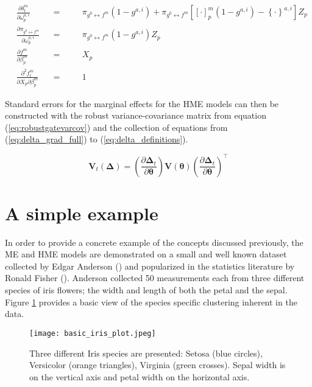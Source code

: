 \documentclass[12pt]{article}
\newcommand{\gateprod}[2]{\pi_{#1 \longleftrightarrow #2}}
\begin{document}
\begin{subequations} \label{eq:delta_definitions}
\begin{alignat}{3}
&\frac{\partial \delta^{m}_{t}}{\partial \omega^{a,i}_{p}}            &&=&\quad& \gateprod{g^{0}}{f^{m}} (1 - g^{a,i})  +  \gateprod{g^{0}}{f^{m}} \left[ \left[\cdot \right]^{m}_p  (1 - g^{a,i}) - \left\{ \cdot \right\}^{a,i}  \right] Z_{p} \label{eq:delta_gate_partial}\\
&\frac{\partial \gateprod{g^{0}}{f^{m}}}{\partial \omega^{a,i}_{p}}   &&=&\quad& \gateprod{g^{0}}{f^{m}} (1 - g^{a,i}) Z_{p} \\
&\frac{\partial f^{m}}{\partial \beta^{m}_{p}}                        &&=&\quad& X_{p} \\
&\frac{\partial^{2} f^{m}_{t}}{\partial X_{p} \partial \beta^{m}_{p}} &&=&\quad& 1
\end{alignat}
\end{subequations}


Standard errors for the marginal effects for the HME models can then be
constructed with the robust variance-covariance matrix from equation
(\ref{eq:robustgatevarcov}) and the collection of equations from
(\ref{eq:delta_grad_full}) to (\ref{eq:delta_definitions}).


\begin{equation}
    \boldsymbol{V}_{t}(\boldsymbol{\Delta}) = \left(\frac{\partial \boldsymbol{\Delta}_{t}}{\partial \boldsymbol{\theta}} \right) \boldsymbol{V}(\boldsymbol{\theta})  \left(\frac{\partial \boldsymbol{\Delta}_{t}}{\partial \boldsymbol{\theta}} \right)^{\top}
\end{equation}


\section{A simple example} \label{sec:SimpleExample}

In order to provide a concrete example of the concepts discussed previously,
the ME and HME models are demonstrated on a small and well known dataset
collected by Edgar Anderson (\cite{Anderson1936}) and popularized in the
statistics literature by Ronald Fisher (\cite{Fisher1936}). Anderson collected
50 measurements each from three different species of iris flowers; the width and
length of both the petal and the sepal. Figure \ref{fig:Iris_dataset} provides a
basic view of the species specific clustering inherent in the data.

\begin{figure}[!ht]
  \texttt{[image: basic\_iris\_plot.jpeg]}
  \caption{Three different Iris species are presented: Setosa
  (blue circles), Versicolor (orange triangles), Virginia (green crosses).
  Sepal width is on the vertical axis and petal width on the horizontal
  axis.}
  \label{fig:Iris_dataset}
\end{figure}
\end{document}
